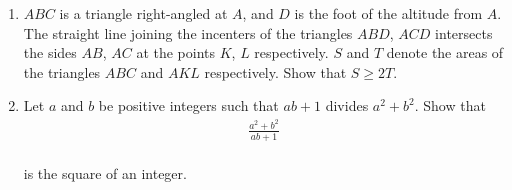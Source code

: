 \documentclass[12pt,-letter paper]{article}
\begin{document}
\begin{enumerate}
	\item $ABC$ is a triangle right-angled at $A$, and $D$ is the foot of the altitude from $A$. The straight line joining the incenters of the triangles $ABD$, $ACD$ intersects the sides $AB$, $AC$ at the points $K$, $L$ respectively. $S$ and $T$ denote the areas of the triangles $ABC$ and $AKL$ respectively. Show that $S\geq 2T$.

	\item Let $a$ and $b$ be positive integers such that $ab + 1$ divides $a^2 + b^2$. Show that \\
		\begin{align*} \frac{a^2+b^2}{ab+1} \end{align*}\\
			is the square of an integer.
\end{enumerate}
\end{document}
